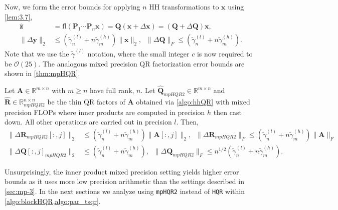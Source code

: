 \documentclass[review,onefignum,onetabnum]{siamart190516}
\newcommand{\R}{\mathbb{R}}
\newcommand{\bb}[1]{\mathbf{#1}}
\newcommand{\fl}{\mathrm{fl}}
\newcommand{\cO}{\mathcal{O}}
\begin{document}
Now, we form the error bounds for applying $n$ HH transformations to $\bb{x}$ using \cref{lem:3.7},
\begin{align}
\hat{\bb{z}} &= \fl(\bb{P}_1\cdots\bb{P}_n\bb{x})=\bb{Q} (\bb{x} +\Delta \bb{x}) = (\bb{Q} + \Delta \bb{Q})\bb{x},\\
\|\Delta \bb{y}\|_2 &\leq (\tilde{\gamma}_n^{(l)}+n\tilde{\gamma}_m^{(h)})\|\bb{x}\|_2,\;\; \|\Delta \bb{Q}\|_F\leq (\tilde{\gamma}_n^{(l)}+n\tilde{\gamma}_m^{(h)}).\label{eqn:mp19.3}
\end{align} 
Note that we use the $\tilde{\gamma}^{(l)}$ notation, where the small integer $c$ is now required to be $\cO(25)$.
The analogous mixed precision QR factorization error bounds are shown in \cref{thm:mpHQR}.
\begin{theorem}
	\label{thm:mpHQR}
	Let $\bb{A}\in\R^{m\times n}$ with $m\geq n$ have full rank, $n$. 
	Let $\hat{\bb{Q}}_{mpHQR2}\in\R^{m\times n}$ and $\hat{\bb{R}}\in\R^{n\times n}_{mpHQR2}$ be the thin QR factors of $\bb{A}$ obtained via \cref{algo:hhQR} with mixed precision FLOPs where inner products are computed in precision $h$ then cast down.
	All other operations are carried out in precision $l$.
	Then,
	\begin{align}
	\|\Delta \bb{R}_{mpHQR2}[:,j]\|_2&\leq (\tilde{\gamma}_n^{(l)}+n\tilde{\gamma}_m^{(h)}) \|\bb{A}[:,j]\|_2,\;\; \|\Delta \bb{R}_{mpHQR2}\|_F\leq (\tilde{\gamma}_n^{(l)}+n\tilde{\gamma}_m^{(h)}) \|\bb{A}\|_F \label{eqn:mpHQR2R}\\
	\|\Delta \bb{Q}[:,j]_{mpHQR2}\|_2&\leq (\tilde{\gamma}_n^{(l)}+n\tilde{\gamma}_m^{(h)}),\;\; \|\Delta \bb{Q}_{mpHQR2}\|_F \leq n^{1/2} (\tilde{\gamma}_n^{(l)}+n\tilde{\gamma}_m^{(h)})\label{eqn:mpHQR2Q}.
	\end{align}
\end{theorem}
Unsurprisingly, the inner product mixed precision setting yields higher error bounds as it uses more low precision arithmetic than the settings described in \cref{sec:mp-3}. 
In the next sections we analyze using {\tt mpHQR2} instead of {\tt HQR} within \cref{algo:blockHQR,algo:par_tsqr}.
\end{document}
